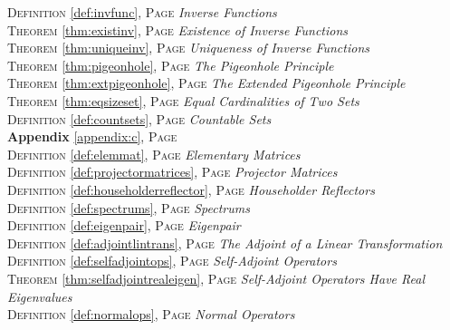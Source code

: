 \begin{multicols}{2}
{\textsc{Definition} \ref{def:invfunc}, \textsc{Page} \pageref{def:invfunc} \textit{Inverse Functions} \\
\textsc{Theorem} \ref{thm:existinv}, \textsc{Page} \pageref{thm:existinv} \textit{Existence of Inverse Functions} \\
\textsc{Theorem} \ref{thm:uniqueinv}, \textsc{Page} \pageref{thm:uniqueinv} \textit{Uniqueness of Inverse Functions} \\
\textsc{Theorem} \ref{thm:pigeonhole}, \textsc{Page} \pageref{thm:pigeonhole} \textit{The Pigeonhole Principle} \\
\textsc{Theorem} \ref{thm:extpigeonhole}, \textsc{Page} \pageref{thm:extpigeonhole} \textit{The Extended Pigeonhole Principle} \\
\textsc{Theorem} \ref{thm:eqsizeset}, \textsc{Page} \pageref{thm:eqsizeset} \textit{Equal Cardinalities of Two Sets} \\
\textsc{Definition} \ref{def:countsets}, \textsc{Page} \pageref{def:countsets} \textit{Countable Sets} \\
\textbf{Appendix} \ref{appendix:c}, \textsc{Page} \pageref{appendix:c} \\
\textsc{Definition} \ref{def:elemmat}, \textsc{Page} \pageref{def:elemmat} \textit{Elementary Matrices} \\
\textsc{Definition} \ref{def:projectormatrices}, \textsc{Page} \pageref{def:projectormatrices} \textit{Projector Matrices} \\
\textsc{Definition} \ref{def:householderreflector}, \textsc{Page} \pageref{def:householderreflector} \textit{Householder Reflectors} \\
\textsc{Definition} \ref{def:spectrums}, \textsc{Page} \pageref{def:spectrums} \textit{Spectrums} \\
\textsc{Definition} \ref{def:eigenpair}, \textsc{Page} \pageref{def:eigenpair} \textit{Eigenpair} \\
\textsc{Definition} \ref{def:adjointlintrans}, \textsc{Page} \pageref{def:adjointlintrans} \textit{The Adjoint of a Linear Transformation} \\
\textsc{Definition} \ref{def:selfadjointops}, \textsc{Page} \pageref{def:selfadjointops} \textit{Self-Adjoint Operators} \\
\textsc{Theorem} \ref{thm:selfadjointrealeigen}, \textsc{Page} \pageref{thm:selfadjointrealeigen} \textit{Self-Adjoint Operators Have Real Eigenvalues} \\
\textsc{Definition} \ref{def:normalops}, \textsc{Page} \pageref{def:normalops} \textit{Normal Operators} \\
}
\end{multicols}
